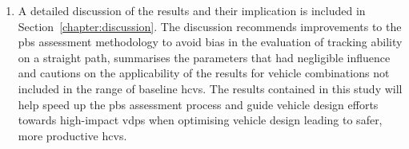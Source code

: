 \begin{enumerate}
\begin{enumerate}
\item Additional \gls{cv} matrices were developed comparing the inertial, geometrical, suspension and tyre \glspl{vdp} in isolation (see Appendices~\ref{section:cv-geometrical}~to~\ref{section:cv-tyre}). These \gls{cv} matrices highlight the \glspl{vdp} with the most influence within each category independent of all other \glspl{vdp} and will guide efforts focused on a specific area of vehicle design.
\end{enumerate}
 
\item A detailed discussion of the results and their implication is included in Section~\ref{chapter:discussion}. The discussion recommends improvements to the \gls{pbs} assessment methodology to avoid bias in the evaluation of tracking ability on a straight path, summarises the parameters that had negligible influence and cautions on the applicability of the results for vehicle combinations not included in the range of baseline \glspl{hcv}. The results contained in this study will help speed up the \gls{pbs} assessment process and guide vehicle design efforts towards high-impact \glspl{vdp} when optimising vehicle design leading to safer, more productive \glspl{hcv}.

\end{enumerate}